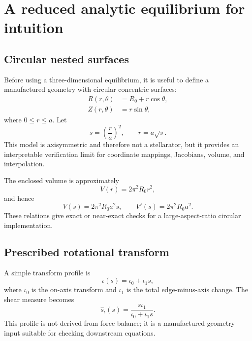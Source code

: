 \section{A reduced analytic equilibrium for intuition}
\label{sec:analytic_model}

\subsection{Circular nested surfaces}
Before using a three-dimensional equilibrium, it is useful to define a manufactured geometry with circular concentric surfaces:
\begin{align}
R(r,\theta)&=R_0+r\cos\theta,\\
Z(r,\theta)&=r\sin\theta,
\end{align}
where $0\leq r\leq a$. Let
\begin{equation}
s=\left(\frac{r}{a}\right)^2,
\qquad
r=a\sqrt{s}.
\end{equation}
This model is axisymmetric and therefore not a stellarator, but it provides an interpretable verification limit for coordinate mappings, Jacobians, volume, and interpolation.

The enclosed volume is approximately
\begin{equation}
V(r)=2\pi^2R_0r^2,
\end{equation}
and hence
\begin{equation}
V(s)=2\pi^2R_0a^2s,
\qquad
V'(s)=2\pi^2R_0a^2.
\end{equation}
These relations give exact or near-exact checks for a large-aspect-ratio circular implementation.

\subsection{Prescribed rotational transform}
A simple transform profile is
\begin{equation}
\iota(s)=\iota_0+\iota_1s,
\label{eq:iota_linear}
\end{equation}
where $\iota_0$ is the on-axis transform and $\iota_1$ is the total edge-minus-axis change. The shear measure becomes
\begin{equation}
\hat s_\iota(s)
=\frac{s\iota_1}{\iota_0+\iota_1s}.
\end{equation}
This profile is not derived from force balance; it is a manufactured geometry input suitable for checking downstream equations.

